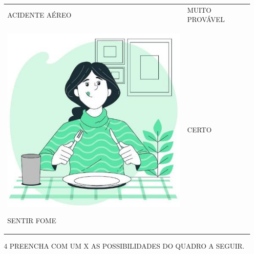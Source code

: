 \begin{longtable}[]{@{}ll@{}}
\begin{minipage}[t]{0.48\columnwidth}
ACIDENTE AÉREO\strut
\end{minipage} & \begin{minipage}[t]{0.48\columnwidth}\raggedright\strut
MUITO PROVÁVEL\strut
\end{minipage}\tabularnewline
\begin{minipage}[t]{0.48\columnwidth}\raggedright\strut
\includegraphics[width=.5\textwidth]{media/image85.jpg}

SENTIR FOME\strut
\end{minipage} & \begin{minipage}[t]{0.48\columnwidth}\raggedright\strut
CERTO\strut
\end{minipage}\tabularnewline
\end{longtable}

\pagebreak
\num{4} PREENCHA COM UM X AS POSSIBILIDADES DO QUADRO A SEGUIR.

